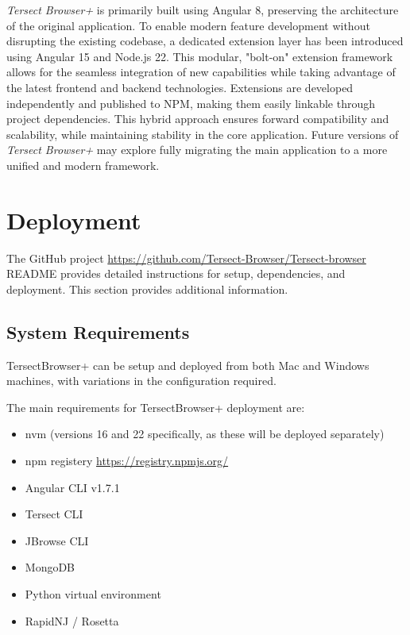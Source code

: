 \documentclass[12pt]{article}
\begin{document}

\textit{Tersect Browser+} is primarily built using Angular 8, preserving the architecture of the original application. To enable modern feature development without disrupting the existing codebase, a dedicated extension layer has been introduced using Angular 15 and Node.js 22. This modular, "bolt-on" extension framework allows for the seamless integration of new capabilities while taking advantage of the latest frontend and backend technologies. Extensions are developed independently and published to NPM, making them easily linkable through project dependencies. This hybrid approach ensures forward compatibility and scalability, while maintaining stability in the core application. Future versions of \textit{Tersect Browser+} may explore fully migrating the main application to a more unified and modern framework.

\section{Deployment}
The GitHub project \url{https://github.com/Tersect-Browser/Tersect-browser} README provides detailed instructions for setup, dependencies, and deployment. This section provides additional information. 


\subsection{System Requirements}
TersectBrowser+ can be setup and deployed from both Mac and Windows machines, with variations in the configuration required. 

The main requirements for TersectBrowser+ deployment are:
\begin{itemize}
    \item nvm (versions 16 and 22 specifically, as these will be deployed separately)
    \item npm registery \url{https://registry.npmjs.org/}
    \item Angular CLI v1.7.1
    \item Tersect CLI
    \item JBrowse CLI
    \item MongoDB
    \item Python virtual environment
    \item RapidNJ / Rosetta
\end{itemize}
\end{document}
